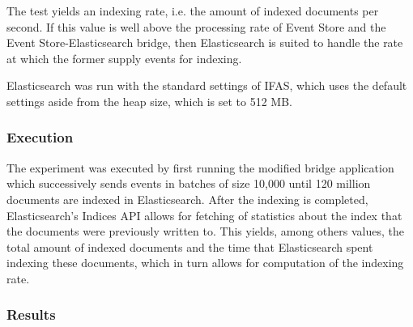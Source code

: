 The test yields an indexing rate, i.e. the amount of indexed documents per second.
If this value is well above the processing rate of Event Store and the Event Store-Elasticsearch bridge, then Elasticsearch is suited to handle the rate at which the former supply events for indexing.

Elasticsearch was run with the standard settings of \ac{IFAS}, which uses the default settings aside from the heap size, which is set to 512 MB.



\subsubsection{Execution}

The experiment was executed by first running the modified bridge application which successively sends events in batches of size 10,000 until 120 million documents are indexed in Elasticsearch.
After the indexing is completed, Elasticsearch's Indices API allows for fetching of statistics about the index that the documents were previously written to.
This yields, among others values, the total amount of indexed documents and the time that Elasticsearch spent indexing these documents, which in turn allows for computation of the indexing rate.

\subsubsection{Results}

